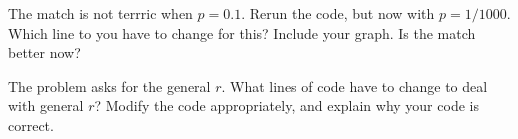 \begin{exercise}
The match is not terrric when $p=0.1$. Rerun the code, but now with $p=1/1000$. Which line to you have to change for this? Include your graph. Is the match better now?
\end{exercise}

\begin{exercise}
The problem asks for the general $r$. What lines of code have to change to deal with general $r$? Modify the code appropriately, and explain why your code is correct.
\end{exercise}
